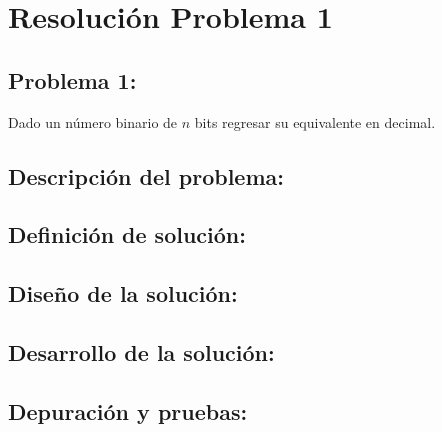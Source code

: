 \section{Resolución Problema 1} 

\subsection{\textbf{Problema 1:}}
Dado un número binario de $n$ bits regresar su equivalente en decimal. 

\subsection{\textbf{Descripción del problema:}}

\subsection{\textbf{Definición de solución:}}

\subsection{\textbf{Diseño de la solución:}}

\subsection{\textbf{Desarrollo de la solución:}}

\subsection{\textbf{Depuración y pruebas:}}